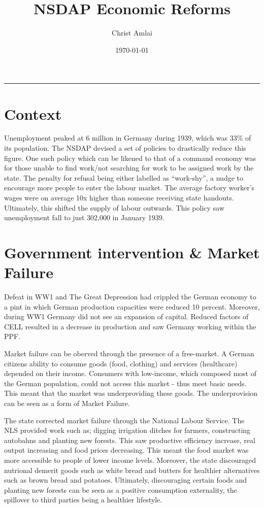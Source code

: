 \documentclass{article}
\title{\textbf{NSDAP Economic Reforms}}
\author{Christ Amlai}
\date{\today}
\begin{document}
\maketitle
\par\rule{\textwidth}{1pt}
\section*{Context}
Unemployment peaked at 6 million in Germany during 1939, which was 33\% of its population.
The NSDAP devised a set of policies to drastically reduce this figure. One such policy
which can be likened to that of a command economy was for those unable to find work/not searching
for work to be assigned work by the state. The penalty for refusal being either labelled as
``work-shy'', a nudge to encourage more people to enter the labour market. The average
factory worker's wages were on average 10x higher than someone
receiving state handouts. Ultimately, this shifted the supply of
labour outwards. This policy saw unemployment fall to just 302,000 in January 1939.

\section*{Government intervention \& Market Failure}
Defeat in WW1 and The Great Depression had crippled the German economy to a
pint in which German production capacities were reduced 10 percent. Moreover, during WW1
Germany did not see an expansion of capital. Reduced factors of CELL resulted
in a decrease in production and saw Germany working within the PPF.

Market failure can be oberved through the presence of a free-market.
A German citizens ability to consume goods (food, clothing) and services (healthcare)
depended on their income. Consumers with low-income, which composed most
of the German population, could not access this market - thus meet basic needs.
This meant that the market was underproviding these goods. The underprovision
can be seen as a form of Market Failure.

The state corrected market failure through the National Labour Service. The NLS
provided work such as; digging irrigation ditches for farmers, constructing autobahns
and planting new forests. This saw productive efficiency increase, real output increasing
and food prices decreasing. This meant the food market was more accessible to people of
lower income levels. Moreover, the state discouraged nutrional demerit goods such as white bread
and butters for healthier alternatives such as brown bread and potatoes. Ultimately,
discouraging certain foods and planting new forests can be seen as a positive consumption
externality, the spillover to third parties being a healthier lifestyle.
\end{document}
